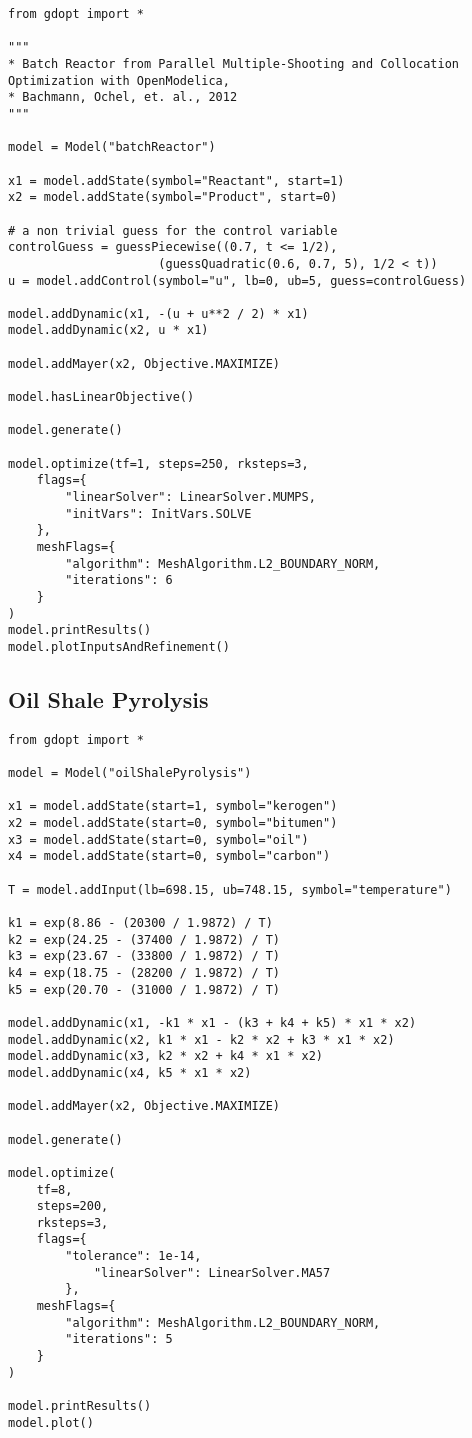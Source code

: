 \documentclass[12pt]{article}
\begin{document}
\begin{lstlisting}
from gdopt import *

"""
* Batch Reactor from Parallel Multiple-Shooting and Collocation Optimization with OpenModelica,
* Bachmann, Ochel, et. al., 2012
"""

model = Model("batchReactor")

x1 = model.addState(symbol="Reactant", start=1)
x2 = model.addState(symbol="Product", start=0)

# a non trivial guess for the control variable
controlGuess = guessPiecewise((0.7, t <= 1/2),
			         (guessQuadratic(0.6, 0.7, 5), 1/2 < t))
u = model.addControl(symbol="u", lb=0, ub=5, guess=controlGuess)

model.addDynamic(x1, -(u + u**2 / 2) * x1)
model.addDynamic(x2, u * x1)

model.addMayer(x2, Objective.MAXIMIZE)

model.hasLinearObjective()

model.generate()

model.optimize(tf=1, steps=250, rksteps=3,
	flags={
		"linearSolver": LinearSolver.MUMPS,
		"initVars": InitVars.SOLVE
	},
	meshFlags={
		"algorithm": MeshAlgorithm.L2_BOUNDARY_NORM,
		"iterations": 6
	}
)
model.printResults()
model.plotInputsAndRefinement()

\end{lstlisting}
\newpage
\subsection{Oil Shale Pyrolysis}

\begin{lstlisting}
from gdopt import *

model = Model("oilShalePyrolysis")

x1 = model.addState(start=1, symbol="kerogen")
x2 = model.addState(start=0, symbol="bitumen")
x3 = model.addState(start=0, symbol="oil")
x4 = model.addState(start=0, symbol="carbon")

T = model.addInput(lb=698.15, ub=748.15, symbol="temperature")

k1 = exp(8.86 - (20300 / 1.9872) / T)
k2 = exp(24.25 - (37400 / 1.9872) / T)
k3 = exp(23.67 - (33800 / 1.9872) / T)
k4 = exp(18.75 - (28200 / 1.9872) / T)
k5 = exp(20.70 - (31000 / 1.9872) / T)

model.addDynamic(x1, -k1 * x1 - (k3 + k4 + k5) * x1 * x2)
model.addDynamic(x2, k1 * x1 - k2 * x2 + k3 * x1 * x2)
model.addDynamic(x3, k2 * x2 + k4 * x1 * x2)
model.addDynamic(x4, k5 * x1 * x2)

model.addMayer(x2, Objective.MAXIMIZE)

model.generate()

model.optimize(
	tf=8,
	steps=200,
	rksteps=3,
	flags={
		"tolerance": 1e-14,
	        "linearSolver": LinearSolver.MA57
        },
	meshFlags={
		"algorithm": MeshAlgorithm.L2_BOUNDARY_NORM,
		"iterations": 5
	}
)

model.printResults()
model.plot()
\end{lstlisting}
\newpage
\end{document}
